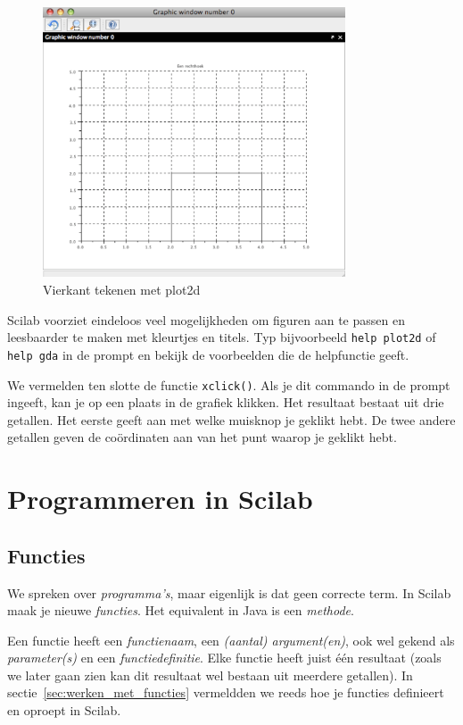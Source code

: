 \begin{figure}[h!t]
   \begin{center}
    \includegraphics[width=0.8\textwidth]{figuren/scilab/11grafiek}
    \caption{Vierkant tekenen met plot2d}
	\label{figg:vierkant}
	\end{center}
\end{figure}

Scilab voorziet eindeloos veel mogelijkheden om figuren aan te passen en leesbaarder te maken met kleurtjes en titels. Typ bijvoorbeeld \verb+help plot2d+ of \verb+help gda+ in de prompt en bekijk de voorbeelden die de helpfunctie geeft.
 
 We vermelden ten slotte de functie \verb/xclick()/. Als je dit commando in de prompt ingeeft, kan je op een plaats in de grafiek klikken. Het resultaat bestaat uit drie getallen. Het eerste geeft aan met welke muisknop je geklikt hebt. De twee andere getallen geven de coördinaten aan van het punt waarop je geklikt hebt.

\section{Programmeren in Scilab}
\subsection{Functies}

We spreken over \emph{programma's}, maar eigenlijk is dat geen correcte term. In Scilab maak je nieuwe \emph{functies}. Het equivalent in Java is een \emph{methode}. 

Een functie heeft een \emph{functienaam}, een \emph{(aantal) argument(en)}, ook wel gekend als \emph{parameter(s)} en een \emph{functiedefinitie}. Elke functie heeft juist \'e\'en resultaat (zoals we later gaan zien kan dit resultaat wel bestaan uit meerdere getallen). In 
sectie~\ref{sec:werken_met_functies} vermeldden we reeds hoe je functies definieert en oproept in Scilab.



